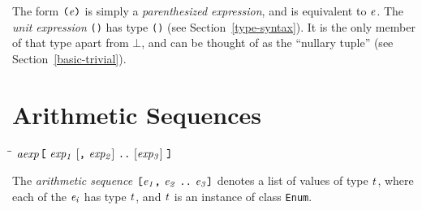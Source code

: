 \noindent
The form \mbox{$\it \makebox{\tt (}e\makebox{\tt )}$} is simply a {\em parenthesized expression}, and is
equivalent to \mbox{$\it e$}.  The {\em unit expression} \mbox{\tt ()} has type
\mbox{\tt ()} (see
Section~\ref{type-syntax}).  It is the only member of that type apart
from $\bot$, and can
be thought of as the ``nullary tuple'' (see Section~\ref{basic-trivial}).
\nopagebreak[4]


\section{Arithmetic Sequences}
\label{arithmetic-sequences}
%
\begin{flushleft}\it\begin{tabbing}
\hspace{0.6in}\=\hspace{3.1in}\=\kill
$\it aexp$\>\makebox[3.5em]{$\rightarrow$}$\it \makebox{\tt [}\ exp_1\ [\makebox{\tt ,}\ exp_2]\ \makebox{\tt ..}\ [exp_3]\ \makebox{\tt ]}$
\end{tabbing}\end{flushleft}
%

\noindent


The {\em arithmetic sequence}
\mbox{$\it \makebox{\tt [}e_1\makebox{\tt ,}\ e_2\ \makebox{\tt ..}\ e_3\makebox{\tt ]}$} denotes a list of values of
type \mbox{$\it t$}, where each of the \mbox{$\it e_i$} has type \mbox{$\it t$}, and \mbox{$\it t$} is an
instance of class \mbox{\tt Enum}.

